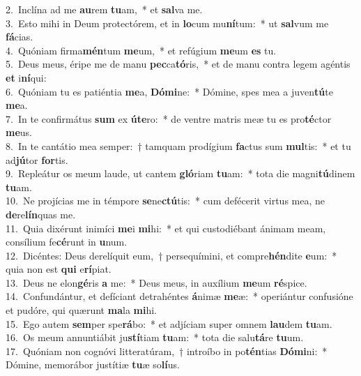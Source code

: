 {2.~}Inclína ad me \textbf{au}rem \textbf{tu}am,~* et \textbf{sal}va me.\\
{3.~}Esto mihi in Deum protectórem, et in \textbf{lo}cum mu\textbf{ní}tum:~* ut \textbf{sal}vum me \textbf{fá}cias.\\
{4.~}Quóniam firma\textbf{mén}tum \textbf{me}um,~* et refúgium \textbf{me}um \textbf{es} tu.\\
{5.~}Deus meus, éripe me de manu \textbf{pec}ca\textbf{tó}ris,~* et de manu contra legem agéntis \textbf{et} i\textbf{ní}qui:\\
{6.~}Quóniam tu es patiéntia \textbf{me}a, \textbf{Dó}\textbf{mi}ne:~* Dómine, spes mea a juven\textbf{tú}te \textbf{me}a.\\
{7.~}In te confirmátus \textbf{sum} ex \textbf{ú}\textbf{te}ro:~* de ventre matris meæ tu es pro\textbf{té}ctor \textbf{me}us.\\
{8.~}In te cantátio mea semper:~† tamquam prodígium \textbf{fa}ctus sum \textbf{mul}tis:~* et tu ad\textbf{jú}tor \textbf{for}tis.\\
{9.~}Repleátur os meum laude, ut cantem \textbf{gló}riam \textbf{tu}am:~* tota die magni\textbf{tú}dinem \textbf{tu}am.\\
{10.~}Ne projícias me in témpore \textbf{se}ne\textbf{ctú}tis:~* cum defécerit virtus mea, ne \textbf{de}re\textbf{lín}quas me.\\
{11.~}Quia dixérunt inimíci \textbf{me}i \textbf{mi}hi:~* et qui custodiébant ánimam meam, consílium fe\textbf{cé}runt in \textbf{u}num.\\
{12.~}Dicéntes: Deus derelíquit eum,~† persequímini, et compre\textbf{hén}dite \textbf{e}um:~* quia non est \textbf{qui} e\textbf{rí}piat.\\
{13.~}Deus ne elon\textbf{gé}ris \textbf{a} me:~* Deus meus, in auxílium \textbf{me}um \textbf{ré}spice.\\
{14.~}Confundántur, et defíciant detrahéntes \textbf{á}nimæ \textbf{me}æ:~* operiántur confusióne et pudóre, qui quærunt \textbf{ma}la \textbf{mi}hi.\\
{15.~}Ego autem \textbf{sem}per spe\textbf{rá}bo:~* et adjíciam super omnem \textbf{lau}dem \textbf{tu}am.\\
{16.~}Os meum annuntiábit ju\textbf{stí}tiam \textbf{tu}am:~* tota die salu\textbf{tá}re \textbf{tu}um.\\
{17.~}Quóniam non cognóvi litteratúram,~† introíbo in po\textbf{tén}tias \textbf{Dó}\textbf{mi}ni:~* Dómine, memorábor justítiæ \textbf{tu}æ so\textbf{lí}us.\\
